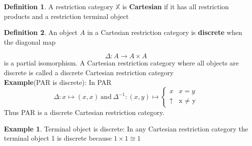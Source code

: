 \documentclass[11pt, oneside]{amsart}
\theoremstyle{definition}
\newtheorem{definition}{Definition}[section]
\theoremstyle{definition}
\newtheorem{exmp}{Example}[section]
\begin{document}
\begin{definition}
 A restriction category $\mathbb{X}$ is \textbf{Cartesian} if it has all restriction products and a restriction terminal object
\end{definition}
\begin{definition}
 An object $A$ in a Cartesian restriction category is \textbf{discrete} when the diagonal map 
\end{definition}
\begin{equation*}
\Delta: A \to A \times A
\end{equation*}
is a partial isomorphism. A Cartesian restriction category where all objects are discrete is called a discrete  Cartesian restriction category \\
\textbf{Example}(PAR is discrete): In PAR
\begin{equation*}
    \Delta: x \mapsto (x,x) \ \text{and}\ \Delta^{-1}: (x,y) \mapsto 
    \begin{cases}
    x & \text{$x=y$}\\
    \uparrow & \text{x $\neq$ y}
    \end{cases}
\end{equation*}
Thus PAR is a discrete Cartesian restriction category.\\
\begin{exmp}
Terminal object is discrete: In any Cartesian restriction category the terminal object 1 is discrete because $1 \times 1 \cong 1$
\end{exmp}
\end{document}
